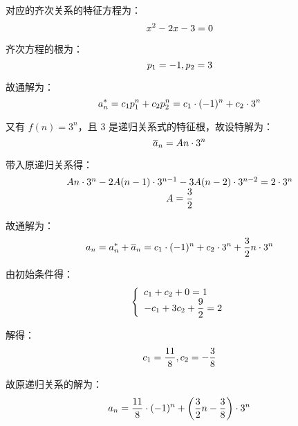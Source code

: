 \documentclass[cn, hazy, blue, normal, 12pt]{elegantnote}
\begin{document}
\begin{solution}[print=true]

    对应的齐次关系的特征方程为：
    \begin{equation}
        \notag
        x^2 - 2x - 3 = 0
    \end{equation}

    齐次方程的根为：
    \begin{equation}
        \notag
        p_1 = -1, p_2 = 3
    \end{equation}

    故通解为：
    \begin{equation}
        \notag
        a_n^\ast = c_1 p_1^n + c_2 p_2^n = c_1 \cdot (-1)^n + c_2 \cdot 3^n
    \end{equation}

    又有 $f(n)=3^n$，且 $3$ 是递归关系式的特征根，故设特解为：
    \begin{equation}
        \notag
        \overline{a}_{n} = An \cdot 3^n
    \end{equation}

    带入原递归关系得：
    \begin{equation}
        \notag
        \begin{array}{c}
            An \cdot 3^{n} - 2A(n-1) \cdot
            3^{n-1} -3A(n-2) \cdot 3^{n-2} =
            2 \cdot 3^{n} \\
            A = \dfrac{3}{2}
        \end{array}
    \end{equation}

    故通解为：
    \begin{equation}
        \notag
        a_{n} =
        a_{n}^{\ast} + \overline{a}_{n}
        = c_1 \cdot (-1)^n + c_2 \cdot 3^n + \dfrac{3}{2} n \cdot 3^n
    \end{equation}

    由初始条件得：
    \begin{equation}
        \notag
        \left\{
        \begin{array}{l}
            c_{1} + c_{2} + 0 = 1 \\
            -c_{1} + 3 c_{2} + \dfrac{9}{2} = 2
        \end{array}
        \right.
    \end{equation}

    解得：
    \begin{equation}
        \notag
        c_{1} = \dfrac{11}{8}, c_{2} = -\dfrac{3}{8}
    \end{equation}

    故原递归关系的解为：
    \begin{equation}
        \notag
        a_{n} = \dfrac{11}{8} \cdot (-1)^n +
        \left( \dfrac{3}{2} n - \dfrac{3}{8} \right) \cdot 3^n
    \end{equation}

\end{solution}
\end{document}

